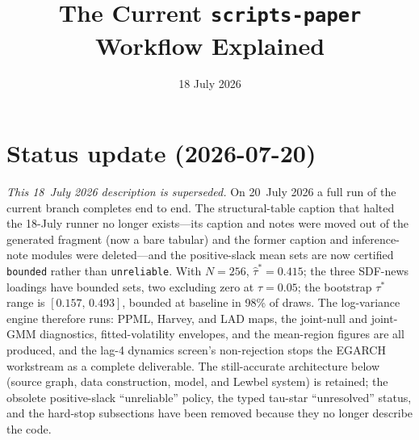 \documentclass[11pt]{article}
\title{The Current \texttt{scripts-paper} Workflow Explained}
\author{}
\date{18 July 2026}
\begin{document}
\maketitle

\section*{Status update (2026-07-20)}

\emph{This 18~July 2026 description is superseded.} On 20~July 2026 a full
run of the current branch completes end to end. The structural-table caption
that halted the 18-July runner no longer exists---its caption and notes were
moved out of the generated fragment (now a bare tabular) and the former
caption and inference-note modules were deleted---and the positive-slack
mean sets are now certified \texttt{bounded} rather than \texttt{unreliable}.
With $N=256$, $\widehat\tau^\ast=0.415$; the three SDF-news loadings have
bounded sets, two excluding zero at $\tau=0.05$; the bootstrap
$\tau^\ast$ range is $[0.157,\,0.493]$, bounded at baseline in 98\% of
draws. The log-variance engine therefore runs: PPML, Harvey, and LAD maps,
the joint-null and joint-GMM diagnostics, fitted-volatility envelopes, and
the mean-region figures are all produced, and the lag-4 dynamics screen's
non-rejection stops the EGARCH workstream as a complete deliverable. The
still-accurate architecture below (source graph, data construction, model,
and Lewbel system) is retained; the obsolete positive-slack
``unreliable'' policy, the typed tau-star ``unresolved'' status, and the
hard-stop subsections have been removed because they no longer describe the
code.
\end{document}
